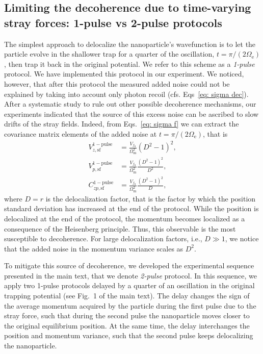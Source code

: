 \documentclass[aps, 
reprint, 
notitlepage,  superscriptaddress, 
onecolumn]{revtex4-1}
\newcommand{\<}{\langle}
\renewcommand{\>}{\rangle}
\newcommand{\Om}{\Omega_\mathrm{m}}
\newcommand{\Oe}{\Omega_\mathrm{e}}
\begin{document}
\subsection{Limiting the decoherence due to time-varying stray forces: 1-pulse vs 2-pulse protocols}
%
The simplest approach to delocalize the nanoparticle's wavefunction is to let the particle evolve in the shallower trap for a quarter of the oscillation, $t=\pi/(2\Oe)$, then trap it back in the original potential. We refer to this scheme as a {\it 1-pulse} protocol.
%
We have implemented this protocol in our experiment. 
%
We noticed, however, that after this protocol the measured added noise could not be explained by taking into account only photon recoil (cfs. Eqs~\eqref{eq: sigma dec}).
%
After a systematic study to rule out other possible decoherence mechanisms, our experiments indicated that the source of this excess noise can be ascribed to slow drifts of the stray fields.
%
Indeed, from Eqs.~\eqref{eq: sigma f} we can extract the covariance matrix elements of the added noise at $t=\pi/(2\Oe)$, that is
\begin{subequations}
\label{eq: sigma f 1pulse with expansion}
    \begin{align}
        V_{z,\mathrm{sf}}^{1-\mathrm{pulse}} &=  \frac{V_{f_0}}{\Om^2} \left( 
 D^2-1 \right)^2, \\
        V_{p,\mathrm{sf}}^{1-\mathrm{pulse}} &=  \frac{V_{f_0}}{\Om^2} \frac{\left( 
 D^2-1 \right)^2}{D^2} , \\
        C_{zp,\mathrm{sf}}^{1-\mathrm{pulse}} &=  \frac{V_{f_0}}{\Om^2} \frac{\left( 
 D^2-1 \right)^2}{D},
    \end{align}
\end{subequations}
where $D=r$ is the delocalization factor, that is the factor by which the position standard deviation has increased at the end of the protocol.
While the position is delocalized at the end of the protocol, the momentum becomes localized as a consequence of the Heisenberg principle.
%
Thus, this observable is the most susceptible to decoherence.
%
For large delocalization factors, i.e., $D\gg1$, we notice that the added noise in the momentum variance scales as $D^2$.

To mitigate this source of decoherence, we developed the experimental sequence presented in the main text, that we denote {\it 2-pulse} protocol.
%
In this sequence, we apply two 1-pulse protocols delayed by a quarter of an oscillation in the original trapping potential (see Fig.~1 of the main text).
%
The delay changes the sign of the average momentum acquired by the particle during the first pulse due to the stray force, such that during the second pulse the nanoparticle moves closer to the original equilibrium position.
%
At the same time, the delay interchanges the position and momentum variance, such that the second pulse keeps delocalizing the nanoparticle.
\end{document}
